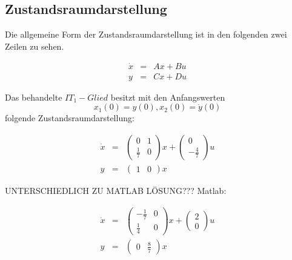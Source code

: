 \subsection{Zustandsraumdarstellung}

Die allgemeine Form der Zustandsraumdarstellung ist in den folgenden zwei Zeilen zu sehen.

\begin{eqnarray*}
	\dot x &=& Ax + Bu \\
	y &=& Cx + Du
\end{eqnarray*}

Das behandelte $IT_1-Glied$ besitzt mit den Anfangswerten \[x_1(0) = y(0),  x_2(0) = \dot y(0)\] folgende Zustandsraumdarstellung:

\begin{eqnarray*}
	\dot x &=& \left(\begin{array}{cc} 0 & 1\\ \frac{1}{7} & 0\end{array}\right) x + \left(\begin{array}{c} 0\\ -\frac{4}{7}\end{array}\right) u \\
	y &=& \left(\begin{array}{cc} 1 & 0\end{array}\right) x
\end{eqnarray*} 




UNTERSCHIEDLICH ZU MATLAB LÖSUNG???
Matlab:

\begin{eqnarray*}
	\dot x &=& \left(\begin{array}{cc} -\frac{1}{7} & 0\\ \frac{1}{4} & 0\end{array}\right) x + \left(\begin{array}{c} 2\\ 0\end{array}\right) u  \\
	y &=& \left(\begin{array}{cc} 0 & \frac{8}{7}\end{array}\right) x
\end{eqnarray*}